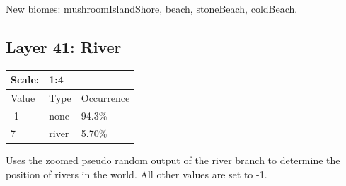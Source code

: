 \documentclass{article}
\begin{document}
	\medskip\noindent
	New biomes: mushroomIslandShore, beach, stoneBeach, coldBeach.

	\subsection{Layer 41: River}
	\begin{tabular}{|l|l|l|}\hline
		Scale: & \multicolumn{2}{|l|}{1:4} \\\hline\hline
		Value  & Type             & Occurrence \\\hline
		-1     & none             & 94.3\%\\\hline
		7      & river            & 5.70\%\\\hline
	\end{tabular}

	\medskip\noindent
	Uses the zoomed pseudo random output of the river branch to determine the position of rivers in the world. All other values are set to -1.
\end{document}
